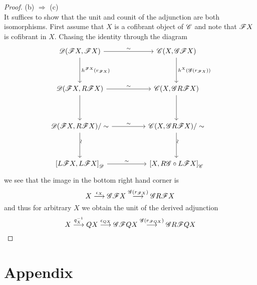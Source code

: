 \documentclass[10pt]{amsart}
\begin{document}
\begin{prop}
\begin{proof}
    (b) $\Rightarrow$ (c)\\
    It suffices to show that the unit and counit of the adjunction are both isomorphisms.
    First assume that $X$ is a cofibrant object of $\mathscr{C}$ and note that $\mathscr{F} X$ is cofibrant in $X$.
    Chasing the identity through the diagram
    $$\begin{tikzcd}
      \D(\F X, \F X) \arrow{rr}{\sim}\arrow{dd}{h^{\F X}(r_{\F X})} && \C(X, \G \F X) \arrow{dd}{h^{X}(\G(r_{\F X}))}\\
      \\
      \D(\F X, R \F X) \arrow{dd}\arrow{rr}{\sim} && \C(X, \G R \F X)\arrow{dd}\\
      \\
      \D(\F X, R \F  X)/\sim \arrow{rr}{\sim}\arrow{dd}[rotate=90,yshift=-0.5ex]{\sim} && \C(X,\G R \F  X)/\sim\arrow{dd}[rotate=90,yshift=-0.5ex]{\sim}\\
      \\
      \left[L\F X, L\F X\right]_\D \arrow{rr}{\sim} && \left[X, R\G \circ L\F X\right]_\C
    \end{tikzcd}$$
    we see that the image in the bottom right hand corner is
    $$X \overset{\epsilon_X}\longrightarrow \mathscr{G} \mathscr{F} X \overset{\mathscr{G}(r_{\mathscr{F} X})}\longrightarrow \mathscr{G} R \mathscr{F} X$$
    and thus for arbitrary $X$ we obtain the unit of the derived adjunction 
    $$X \overset{q_X^{-1}}\longrightarrow QX \overset{\epsilon_{QX}}\longrightarrow \mathscr{G} \mathscr{F} QX \overset{\mathscr{G}(r_{\mathscr{F} QX})}\longrightarrow \mathscr{G} R \mathscr{F} QX$$
  \end{proof}
\end{prop}

\section{Appendix}
\end{document}

